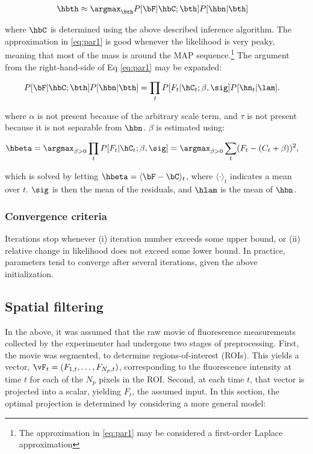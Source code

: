 \begin{align} \label{eq:par2}
\hbth &\approx \argmax_{\bth} P[\bF| \hbC; \bth] P[\hbn | \bth]
\end{align}

\noindent where $\hbC$ is determined using the above described inference algorithm. The approximation in \eqref{eq:par1} is good whenever the likelihood is very peaky, meaning that most of the mass is around the MAP sequence.\footnote{The approximation in \eqref{eq:par1} may be considered a first-order Laplace approximation}   The argument from the right-hand-side of Eq \eqref{eq:par1} may be expanded: 

\begin{align} \label{eq:par2}
P[\bF| \hbC; \bth] P[\hbn | \bth] &= \prod_t P[F_t | \hC_t; \beta,\sig]  P[\hn_t | \lam].
\end{align}

\noindent where $\alpha$ is not present because of the arbitrary scale term, and $\tau$ is not present because it is not separable from $\hbn$. $\beta$ is estimated using:

\begin{align}
	\hbeta &= \argmax_{\beta >0} \prod_t P[F_t | \hC_t; \beta,\sig] = \argmax_{\beta>0} \sum_t (F_t - (C_t + \beta))^2,
\end{align}

\noindent which is solved by letting $\hbeta=\langle \bF-\bC \rangle_t$, where $\langle \cdot \rangle_t$ indicates a mean over $t$.  $\sig$ is then the mean of the residuals, and $\hlam$ is the mean of $\hbn$. 

\subsubsection{Convergence criteria}

Iterations stop whenever (i) iteration number exceeds some upper bound, or (ii) relative change in likelihood does not exceed some lower bound.  In practice, parameters tend to converge after several iterations, given the above initialization. 


\subsection{Spatial filtering} \label{sec:spatial}

In the above, it was assumed that the raw movie of fluorescence measurements collected by the experimenter had undergone two stages of preprocessing.  First, the movie was segmented, to determine regions-of-interest (ROIs).  This yields a vector, $\vF_t=(F_{1,t}, \ldots, F_{N_p,t})$, corresponding to the fluorescence intensity at time $t$ for each of the $N_p$ pixels in the ROI.  Second, at each time $t$, that vector is projected into a scalar, yielding $F_t$, the assumed input.  In this section, the optimal projection is determined by considering a more general model:

